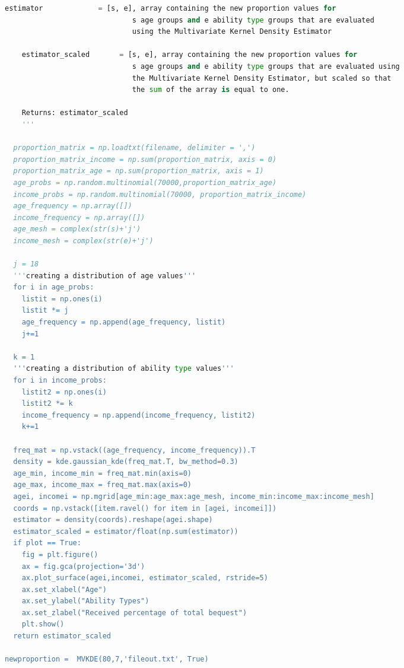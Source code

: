 \documentclass[letterpaper,12pt]{article}
\theoremstyle{definition}
\begin{document}
\begin{spacing}{1.5}
\begin{lstlisting}[language=Python, caption=MVKDE.py]
    estimator             = [s, e], array containing the new proportion values for 
                              s age groups and e ability type groups that are evaluated 
                              using the Multivariate Kernel Density Estimator

    estimator_scaled       = [s, e], array containing the new proportion values for 
                              s age groups and e ability type groups that are evaluated using 
                              the Multivariate Kernel Density Estimator, but scaled so that 
                              the sum of the array is equal to one.

    Returns: estimator_scaled
    '''

  proportion_matrix = np.loadtxt(filename, delimiter = ',')
  proportion_matrix_income = np.sum(proportion_matrix, axis = 0)
  proportion_matrix_age = np.sum(proportion_matrix, axis = 1)
  age_probs = np.random.multinomial(70000,proportion_matrix_age)
  income_probs = np.random.multinomial(70000, proportion_matrix_income)
  age_frequency = np.array([])
  income_frequency = np.array([])
  age_mesh = complex(str(s)+'j')
  income_mesh = complex(str(e)+'j')

  j = 18
  '''creating a distribution of age values'''
  for i in age_probs:
    listit = np.ones(i)
    listit *= j
    age_frequency = np.append(age_frequency, listit)
    j+=1

  k = 1
  '''creating a distribution of ability type values'''
  for i in income_probs:
    listit2 = np.ones(i)
    listit2 *= k
    income_frequency = np.append(income_frequency, listit2)
    k+=1

  freq_mat = np.vstack((age_frequency, income_frequency)).T
  density = kde.gaussian_kde(freq_mat.T, bw_method=0.3)
  age_min, income_min = freq_mat.min(axis=0)
  age_max, income_max = freq_mat.max(axis=0)
  agei, incomei = np.mgrid[age_min:age_max:age_mesh, income_min:income_max:income_mesh]
  coords = np.vstack([item.ravel() for item in [agei, incomei]])
  estimator = density(coords).reshape(agei.shape)
  estimator_scaled = estimator/float(np.sum(estimator)) 
  if plot == True:
    fig = plt.figure()
    ax = fig.gca(projection='3d')
    ax.plot_surface(agei,incomei, estimator_scaled, rstride=5)
    ax.set_xlabel("Age")
    ax.set_ylabel("Ability Types")
    ax.set_zlabel("Received percentage of total bequest")
    plt.show()
  return estimator_scaled

newproportion =  MVKDE(80,7,'fileout.txt', True)
    \end{lstlisting}



\end{spacing}
\end{document}
